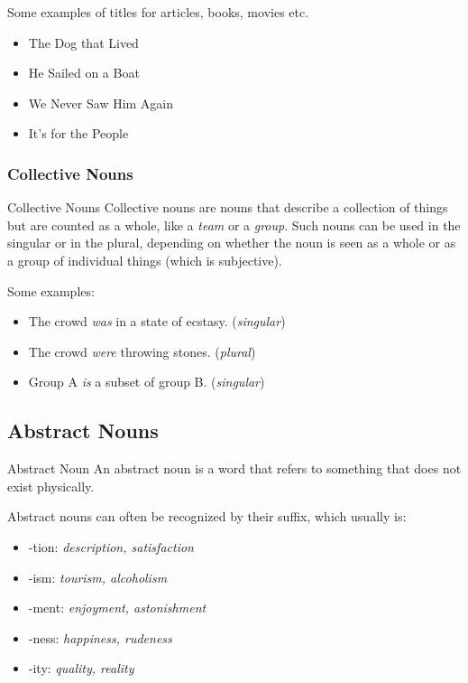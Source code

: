 Some examples of titles for articles, books, movies etc.
\begin{itemize}
    \item The Dog that Lived
    \item He Sailed on a Boat
    \item We Never Saw Him Again
    \item It's for the People
\end{itemize}

\subsubsection{Collective Nouns}
\begin{definition}{Collective Nouns}{}
    Collective nouns are nouns that describe a collection of things but are counted as a whole, like a \textit{team} or a \textit{group}. Such nouns can be used in the singular or in the plural, depending on whether the noun is seen as a whole or as a group of individual things (which is subjective).
\end{definition}
\label{Collective Nouns}

Some examples:
\begin{itemize}
    \item The crowd \textit{was} in a state of ecstasy. (\textit{singular})
    \item The crowd \textit{were} throwing stones. (\textit{plural})
    \item Group A \textit{is} a subset of group B. (\textit{singular})
\end{itemize}

\newpage
\subsection{Abstract Nouns}
\begin{definition}{Abstract Noun}{}
    An abstract noun is a word that refers to something that does not exist physically.
\end{definition}
Abstract nouns can often be recognized by their suffix, which usually is:
\begin{itemize}
    \item -tion: \textit{description, satisfaction}
    \item -ism: \textit{tourism, alcoholism}
    \item -ment: \textit{enjoyment, astonishment}
    \item -ness: \textit{happiness, rudeness}
    \item -ity: \textit{quality, reality}
\end{itemize}

